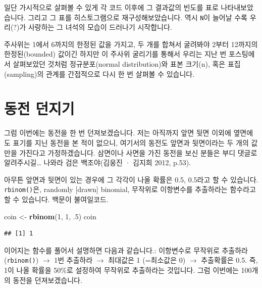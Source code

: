 \documentclass[]{book}
\newenvironment{Shaded}{\begin{snugshade}}{\end{snugshade}}
\newcommand{\CommentTok}[1]{\textcolor[rgb]{0.56,0.35,0.01}{\textit{#1}}}
\newcommand{\DecValTok}[1]{\textcolor[rgb]{0.00,0.00,0.81}{#1}}
\newcommand{\FloatTok}[1]{\textcolor[rgb]{0.00,0.00,0.81}{#1}}
\newcommand{\KeywordTok}[1]{\textcolor[rgb]{0.13,0.29,0.53}{\textbf{#1}}}
\newcommand{\NormalTok}[1]{#1}
\newcommand{\OperatorTok}[1]{\textcolor[rgb]{0.81,0.36,0.00}{\textbf{#1}}}
\newcommand{\StringTok}[1]{\textcolor[rgb]{0.31,0.60,0.02}{#1}}
\begin{document}
일단 가시적으로 살펴볼 수 있게 각 코드 이후에 그 결과값의 빈도를 표로 나타내보았습니다. 그리고 그 표를 히스토그램으로 재구성해보았습니다. 역시 \texttt{N}이 늘어날 수록 우리(?)가 사랑하는 그 녀석의 모습이 드러나기 시작합니다.

주사위는 1에서 6까지의 한정된 값을 가지고, 두 개를 합쳐서 굴려봐야 2부터 12까지의 한정된(bounded) 값이긴 하지만 이 주사위 굴리기를 통해서 우리는 지난 번 포스팅에서 살펴보았던 것처럼 정규분포(normal distribution)와 표본 크기(n), 혹은 표집(sampling)의 관계를 간접적으로 다시 한 번 살펴볼 수 있습니다.

\hypertarget{uxb3d9uxc804-uxb358uxc9c0uxae30}{%
\section{동전 던지기}\label{uxb3d9uxc804-uxb358uxc9c0uxae30}}

그럼 이번에는 동전을 한 번 던져보겠습니다. 저는 아직까지 앞면 뒷면 이외에 옆면에도 표기를 지닌 동전을 본 적이 없으니, 여기서의 동전도 앞면과 뒷면이라는 두 개의 값만을 가진다고 가정하겠습니다. 삼면이나 사면을 가진 동전을 보신 분들은 부디 댓글로 알려주시길\ldots{} 나와라 검은 백조야(김웅진 · 김지희 2012, p.53).

아무튼 앞면과 뒷면이 있는 경우에 그 각각이 나올 확률은 0.5, 0.5라고 할 수 있습니다. \texttt{rbinom()}은, randomly {[}drawn{]} binomial, 무작위로 이항변수를 추출하라는 함수라고 할 수 있습니다. 백문이 불여일코드.

\begin{Shaded}
\begin{Highlighting}[]
\NormalTok{coin <-}\StringTok{ }\KeywordTok{rbinom}\NormalTok{(}\DecValTok{1}\NormalTok{, }\DecValTok{1}\NormalTok{, }\FloatTok{.5}\NormalTok{)}
\NormalTok{coin}
\end{Highlighting}
\end{Shaded}

\begin{verbatim}
## [1] 1
\end{verbatim}

이어지는 함수를 풀어서 설명하면 다음과 같습니다.: 이항변수로 무작위로 추출하라(\texttt{rbinom()}) \(\rightarrow\) 1번 추출하라 \(\rightarrow\) 최대값은 1 (=최소값은 0) \(\rightarrow\) 추출확률은 0.5. 즉, 1이 나올 확률을 50\%로 설정하여 무작위로 추출하라는 것입니다. 그럼 이번에는 100개의 동전을 던져보겠습니다.

\begin{Shaded}
\end{Shaded}
\end{document}
